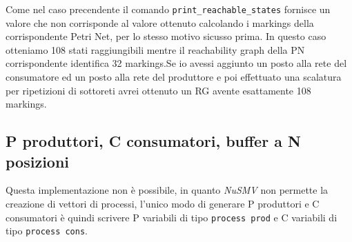 \documentclass[a4paper]{article}
\begin{document}
Come nel caso precendente il comando \texttt{print\_reachable\_states} fornisce un valore che non corrisponde al valore ottenuto calcolando i markings della corrispondente Petri Net, per lo stesso motivo sicusso prima.
In questo caso otteniamo 108 stati raggiungibili mentre il reachability graph della PN corrispondente identifica 32 markings.Se io avessi aggiunto un posto alla rete del consumatore ed un posto alla rete del produttore e poi effettuato una scalatura per ripetizioni di sottoreti avrei ottenuto un RG avente esattamente 108 markings.
\newpage
\subsection{P produttori, C consumatori, buffer a N posizioni}
Questa implementazione non è possibile, in quanto \emph{NuSMV} non permette la creazione di vettori di processi, l'unico modo di generare P produttori e C consumatori è quindi scrivere P variabili di tipo \texttt{process prod} e C variabili di tipo \texttt{process cons}.
\end{document}

